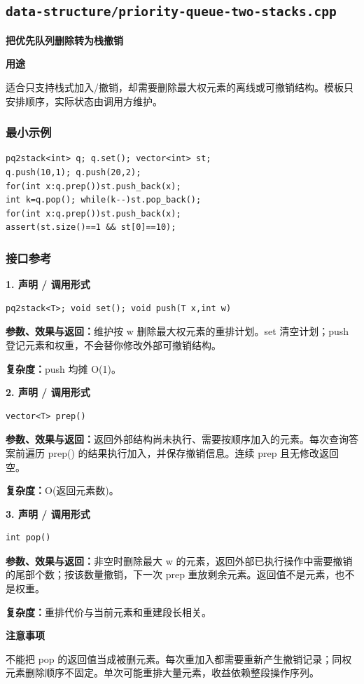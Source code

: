 \documentclass[UTF8,a4paper,10pt]{ctexart}
\newcommand{\TemplUsage}[1]{\textbf{用途}\par #1\par}
\newcommand{\TemplNote}[1]{\textbf{注意事项}\par #1\par}
\begin{document}
\subsection{\texttt{data-structure/priority-queue-two-stacks.cpp}}
\textbf{把优先队列删除转为栈撤销}\par
\TemplUsage{适合只支持栈式加入/撤销，却需要删除最大权元素的离线或可撤销结构。模板只安排顺序，实际状态由调用方维护。}
\subsubsection*{最小示例}
\begin{lstlisting}
pq2stack<int> q; q.set(); vector<int> st;
q.push(10,1); q.push(20,2);
for(int x:q.prep())st.push_back(x);
int k=q.pop(); while(k--)st.pop_back();
for(int x:q.prep())st.push_back(x);
assert(st.size()==1 && st[0]==10);
\end{lstlisting}
\subsubsection*{接口参考}
\noindent\begin{minipage}{\textwidth}
\textbf{1. 声明 / 调用形式}
\begin{lstlisting}
pq2stack<T>; void set(); void push(T x,int w)
\end{lstlisting}
\textbf{参数、效果与返回：}维护按 w 删除最大权元素的重排计划。set 清空计划；push 登记元素和权重，不会替你修改外部可撤销结构。

\textbf{复杂度：}push 均摊 O(1)。

\end{minipage}\par\vspace{0.4em}
\noindent\begin{minipage}{\textwidth}
\textbf{2. 声明 / 调用形式}
\begin{lstlisting}
vector<T> prep()
\end{lstlisting}
\textbf{参数、效果与返回：}返回外部结构尚未执行、需要按顺序加入的元素。每次查询答案前遍历 prep() 的结果执行加入，并保存撤销信息。连续 prep 且无修改返回空。

\textbf{复杂度：}O(返回元素数)。

\end{minipage}\par\vspace{0.4em}
\noindent\begin{minipage}{\textwidth}
\textbf{3. 声明 / 调用形式}
\begin{lstlisting}
int pop()
\end{lstlisting}
\textbf{参数、效果与返回：}非空时删除最大 w 的元素，返回外部已执行操作中需要撤销的尾部个数；按该数量撤销，下一次 prep 重放剩余元素。返回值不是元素，也不是权重。

\textbf{复杂度：}重排代价与当前元素和重建段长相关。

\TemplNote{不能把 pop 的返回值当成被删元素。每次重加入都需要重新产生撤销记录；同权元素删除顺序不固定。单次可能重排大量元素，收益依赖整段操作序列。}
\end{minipage}\par\vspace{0.4em}
\clearpage
\end{document}
